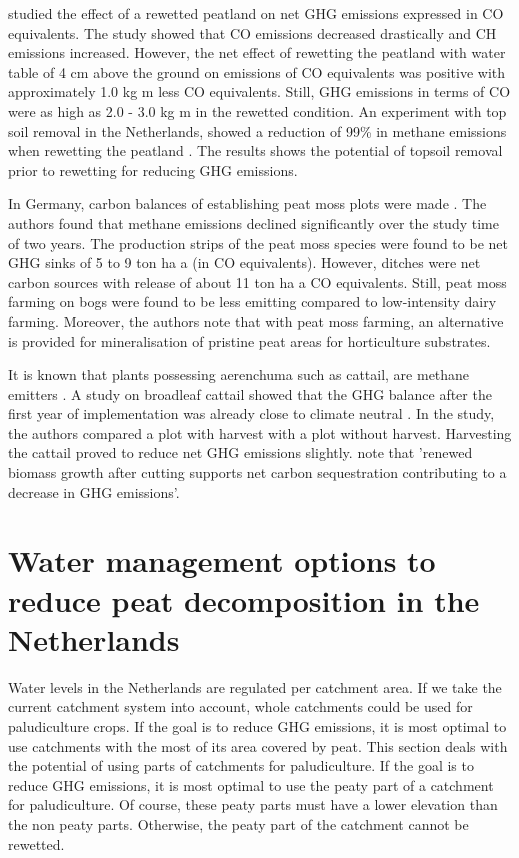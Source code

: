 {\begin{enumerate}
\citet{van2013rewetting} studied the effect of a rewetted peatland on net GHG emissions expressed in CO equivalents. The study showed that CO emissions decreased drastically and CH emissions increased. However, the net effect of rewetting the peatland with water table of 4 cm above the ground on emissions of CO equivalents was positive with approximately 1.0 kg m less CO equivalents. Still, GHG emissions in terms of CO were as high as 2.0 - 3.0 kg m in the rewetted condition. An experiment with top soil removal in the Netherlands, showed a reduction of 99\% in methane emissions when rewetting the peatland \citep{harpenslager2015rewetting}. The results shows the potential of topsoil removal prior to rewetting for reducing GHG emissions. 

In Germany, carbon balances of establishing peat moss plots were made \citep{gunther2017greenhouse}. The authors found that methane emissions declined significantly over the study time of two years. The production strips of the peat moss  species were found to be net GHG sinks of 5 to 9 ton ha a (in CO equivalents). However, ditches were net carbon sources with release of about 11 ton ha a CO equivalents. Still, peat moss farming on bogs were found to be less emitting compared to low-intensity dairy farming. Moreover, the authors note that with peat moss farming, an alternative is provided for mineralisation of pristine peat areas for horticulture substrates.
 
It is known that plants possessing aerenchuma such as cattail, are methane emitters \citep{wichtmann2016paludiculture}. A study on broadleaf cattail showed that the GHG balance after the first year of implementation was already close to climate neutral \citep{guntherghgtypha}. In the study, the authors compared a plot with harvest with a plot without harvest. Harvesting the cattail proved to reduce net GHG emissions slightly. \citet{wichtmann2016paludiculture} note that 'renewed biomass growth after cutting supports net carbon sequestration contributing to a decrease in GHG emissions'. 

\section{Water management options to reduce peat decomposition in the Netherlands}
Water levels in the Netherlands are regulated per catchment area. If we take the current catchment system into account, whole catchments could be used for paludiculture crops. If the goal is to reduce GHG emissions, it is most optimal to use catchments with the most of its area covered by peat. 
This section deals with the potential of using parts of catchments for paludiculture. If the goal is to reduce GHG emissions, it is most optimal to use the peaty part of a catchment for paludiculture. Of course, these peaty parts must have a lower elevation than the non peaty parts. Otherwise, the peaty part of the catchment cannot be rewetted. 


\end{enumerate}}
